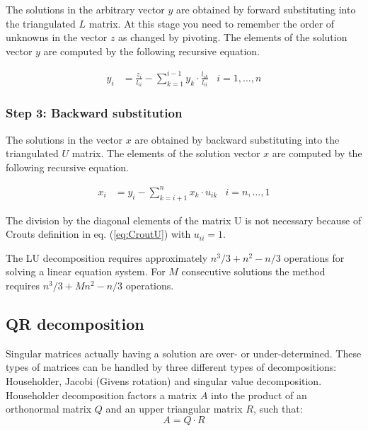 The solutions in the arbitrary vector $y$ are obtained by forward
substituting into the triangulated $L$ matrix.  At this stage you need
to remember the order of unknowns in the vector $z$ as changed by
pivoting.  The elements of the solution vector $y$ are computed by the
following recursive equation.

\begin{align}
y_{i} &= \frac{z_{i}}{l_{ii}} - \sum_{k=1}^{i-1} y_{k}\cdot \frac{l_{ik}}{l_{ii}} & i = 1,\ldots,n
\end{align}

\subsubsection{Step 3: Backward substitution}
\label{sec:CroutBSubst}

The solutions in the vector $x$ are obtained by backward substituting
into the triangulated $U$ matrix.  The elements of the solution vector
$x$ are computed by the following recursive equation.

\begin{align}
x_{i} &= y_{i} - \sum_{k=i+1}^{n} x_{k}\cdot u_{ik} & i = n,\ldots,1
\end{align}

The division by the diagonal elements of the matrix U is not necessary
because of Crouts definition in eq. (\ref{eq:CroutU}) with $u_{ii} =
1$.

\addvspace{12pt}

The LU decomposition requires approximately $n^3/3 + n^2 - n/3$
operations for solving a linear equation system.  For $M$ consecutive
solutions the method requires $n^3/3 + Mn^2 - n/3$ operations.

\subsection{QR decomposition}

Singular matrices actually having a solution are over- or
under-determined.  These types of matrices can be handled by three
different types of decompositions: Householder, Jacobi (Givens
rotation) and singular value decomposition.  Householder decomposition
factors a matrix $A$ into the product of an orthonormal matrix $Q$ and
an upper triangular matrix $R$, such that:
\begin{equation}
A = Q\cdot R
\end{equation}

